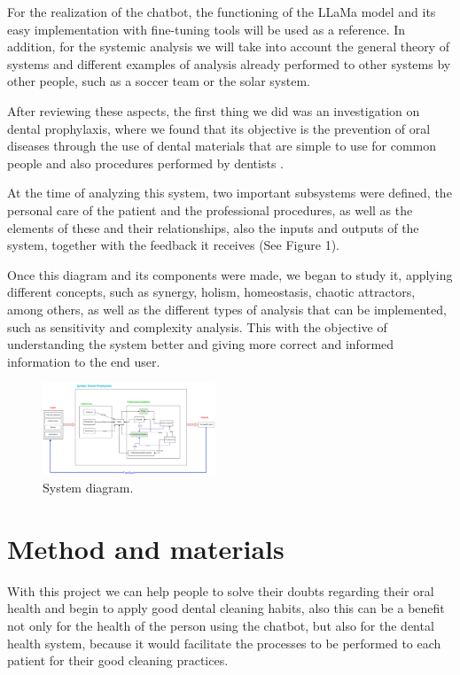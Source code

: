 \documentclass[conference]{IEEEtran}
\begin{document}
For the realization of the chatbot, the functioning of the LLaMa model and its easy implementation with fine-tuning tools will be used as a reference. In addition, for the systemic analysis we will take into account the general theory of systems and different examples of analysis already performed to other systems by other people, such as a soccer team or the solar system. 

After reviewing these aspects, the first thing we did was an investigation on dental prophylaxis, where we found that its objective is the prevention of oral diseases through the use of dental materials that are simple to use for common people and also procedures performed by dentists \cite{b1}\cite{b2}. 

At the time of analyzing this system, two important subsystems were defined, the personal care of the patient and the professional procedures, as well as the elements of these and their relationships, also the inputs and outputs of the system, together with the feedback it receives (See Figure 1).

Once this diagram and its components were made, we began to study it, applying different concepts, such as synergy, holism, homeostasis, chaotic attractors, among others, as well as the different types of analysis that can be implemented, such as sensitivity and complexity analysis. This with the objective of understanding the system better and giving more correct and informed information to the end user.

\begin{figure}[htbp]
    \centerline{\includegraphics[width=0.46\textwidth]{figures/fig1.png}}
    \caption{System diagram.}
    \label{fig}
\end{figure}

\section{Method and materials}

With this project we can help people to solve their doubts regarding their oral health and begin to apply good dental cleaning habits, also this can be a benefit not only for the health of the person using the chatbot, but also for the dental health system, because it would facilitate the processes to be performed to each patient for their good cleaning practices.
\end{document}
